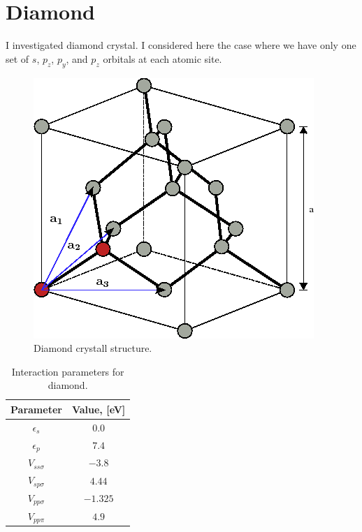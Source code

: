 \chapter{Diamond}
I investigated diamond crystal. I considered here the case where we have only one set of $s$, $p_z$, $p_y$, and $p_z$ orbitals at each
atomic site.
\begin{figure}[h] 
 \begin{center}
  \includegraphics[width=0.3\linewidth]{img/diamond_crystall}
  \caption{Diamond crystall structure.}
 \end{center}
\end{figure}

\begin{table}[h]
 \begin{center}
  \begin{tabular}{|c|c|}
  \hline
    Parameter&Value, [eV]\\ \hline
    $\epsilon_s$ & $0.0$ \\ \hline
    $\epsilon_p$ & $7.4$ \\ \hline
    $V_{ss \sigma}$ & $-3.8$  \\ \hline
    $V_{sp \sigma}$ & $4.44$\\ \hline
    $V_{pp \sigma}$ & $-1.325$ \\ \hline
    $V_{pp \pi}$ &  $4.9$\\ \hline
  \end{tabular}
 \end{center}
  \caption{Interaction parameters for diamond.}
\end{table}

